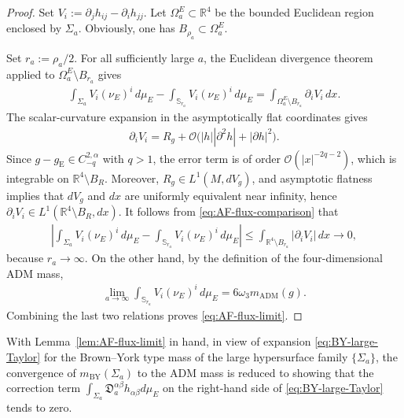 \documentclass[10pt,a4paper]{amsart}
\newcommand{\R}{\mathbb{R}}
\newcommand{\Sph}{\mathbb{S}}
\newcommand{\gE}{g_{\mathrm{E}}}
\newcommand{\ADM}{\mathrm{ADM}}
\newcommand{\BY}{\mathrm{BY}}
\begin{document}
	\begin{proof}
		Set $V_i:=\partial_jh_{ij}-\partial_ih_{jj}$. Let $\Omega_a^E\subset\R^4$ be the bounded Euclidean region enclosed by
		$\Sigma_a$. Obviously, one has $B_{\rho_a}\subset\Omega_a^E$.
		
		Set $r_a:=\rho_a/2$. For all sufficiently large $a$, the Euclidean
		divergence theorem applied to $\Omega_a^E\setminus B_{r_a}$ gives
		\begin{align}\label{eq:AF-flux-comparison}
			\int_{\Sigma_a}
			V_i(\nu_E)^i\,d\mu_E
			-
			\int_{\Sph_{r_a}}
			V_i(\nu_E)^i\,d\mu_E
			=
			\int_{\Omega_a^E\setminus B_{r_a}}
			\partial_iV_i\,dx .
		\end{align}
		The scalar-curvature expansion in the asymptotically flat coordinates
		gives
		\begin{align*}
			\partial_iV_i
			=
			R_g
			+
			\mathcal O\bigl(
			|h||\partial^2h|
			+
			|\partial h|^2
			\bigr).
		\end{align*}
		Since $g-\gE\in C^{2,\alpha}_{-q}$ with $q>1$, the error term is of order $\mathcal O(|x|^{-2q-2})$, which is integrable on $\R^4\setminus B_R$. Moreover,
		$R_g\in L^1(M,dV_g)$, and asymptotic flatness implies that $dV_g$ and $dx$ are uniformly equivalent near infinity, hence $\partial_iV_i \in L^1(\R^4\setminus B_R,dx)$. It follows from \eqref{eq:AF-flux-comparison} that
		\begin{align*}
			\left|
			\int_{\Sigma_a}
			V_i(\nu_E)^i\,d\mu_E
			-
			\int_{\Sph_{r_a}}
			V_i(\nu_E)^i\,d\mu_E
			\right|
			\leq
			\int_{\R^4\setminus B_{r_a}}
			|\partial_iV_i|\,dx
			\longrightarrow
			0,
		\end{align*}
		because $r_a\to\infty$. On the other hand, by the definition of the
		four-dimensional ADM mass,
		\begin{align*}
			\lim_{a\to\infty}
			\int_{\Sph_{r_a}}
			V_i(\nu_E)^i\,d\mu_E
			=
			6\omega_3m_{\ADM}(g).
		\end{align*}
		Combining the last two relations proves
		\eqref{eq:AF-flux-limit}.
	\end{proof}
	
	With Lemma~\ref{lem:AF-flux-limit} in hand, in view of expansion \eqref{eq:BY-large-Taylor} for the Brown--York type mass of the large hypersurface family $\{\Sigma_a\}$, the convergence of $m_{\BY}(\Sigma_a)$ to the ADM mass is reduced to
	showing that the correction term $\int_{\Sigma_a}
	\mathfrak D_a^{\alpha\beta}
	h_{\alpha\beta}d\mu_E$ on the right-hand side of \eqref{eq:BY-large-Taylor} tends to zero.
	
\end{document}
